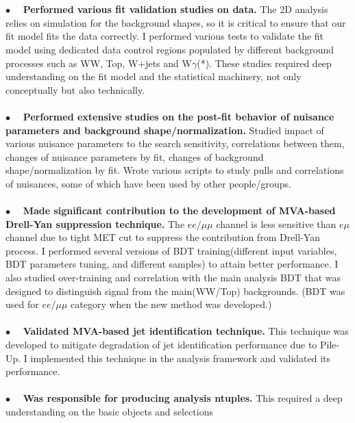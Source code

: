 \documentclass[margin]{res}
\begin{document}
\begin{resume}
    \\  
    \\
    $\bullet\quad$  \textbf{Performed various fit validation studies on data.} The 2D analysis relies on 
      simulation for the background shapes, so it is critical to ensure that our fit 
      model fits the data correctly. I performed various tests to validate the fit
      model using dedicated data control regions populated by different background processes 
      such as WW, Top, W+jets and W$\gamma$(*). These studies required deep understanding
      on the fit model and the statistical machinery, not only conceptually but also
      technically.
    \\ 
    \\
    $\bullet\quad$  \textbf{Performed extensive studies on the post-fit behavior of nuisance parameters 
      and background shape/normalization.}
      Studied impact of various nuisance parameters to the search sensitivity,  
      correlations between them, changes of nuisance parameters by fit, 
      changes of background shape/normalization by fit.
      Wrote various scripts to study pulls and correlations of nuisances, 
      some of which have been used by other people/groups.  
    \\
    \\
    $\bullet\quad$  \textbf{Made significant contribution to the development of MVA-based Drell-Yan suppression technique.}
      The $ee/\mu\mu$ channel is less sensitive than $e\mu$ channel due to
      tight MET cut to suppress the contribution from Drell-Yan process. I performed 
      several versions of BDT training(different input variables, 
      BDT parameters tuning, and different samples) to attain better performance. 
      I also studied over-training and correlation with the main analysis BDT that was 
      designed to distinguish signal from the main(WW/Top) backgrounds.  
      (BDT was used for $ee/\mu\mu$ category when the new method was developed.)
    \\
    \\
    $\bullet\quad$  \textbf{Validated MVA-based jet identification technique.} This technique was developed 
      to mitigate degradation of jet identification performance due to Pile-Up. 
      I implemented this technique in the analysis framework and validated its performance.
    \\
    \\
    $\bullet\quad$  \textbf{Was responsible for producing analysis ntuples. }
      This required a deep understanding on the basic objects and selections 

\end{resume}
\end{document}
